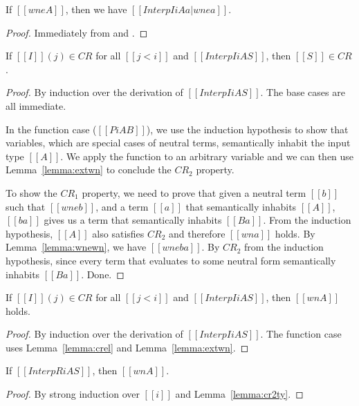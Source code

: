 \documentclass[acmsmall,screen=true,
\ifpublic review=false\else,review=true\fi
  ,anonymous=\ifanonymous true\else false\fi]{acmart}
\begin{document}
\begin{lemma}
  \label{lemma:cr1ty}
  If $[[wne A]]$, then we have $[[Interp I i A {a | wne a }]]$.
\end{lemma}
\begin{proof}
  Immediately from  and .
\end{proof}

\begin{lemma}
  \label{lemma:crel}
  If $[[I]](j) \in CR$ for all $[[j < i]]$ and $[[Interp I i A S]]$, then $[[S]] \in CR$.
\end{lemma}
\begin{proof}
  By induction over the derivation of $[[Interp I i A S]]$. The base
  cases are all immediate.

  In the function case ($[[Pi A B]]$), we use the induction
  hypothesis to show that variables, which are special cases of
  neutral terms, semantically inhabit the input type $[[A]]$. We apply the
  function to an arbitrary variable and we can then use
  Lemma~\ref{lemma:extwn} to conclude the $CR_2$ property.

  To show
  the $CR_1$ property, we need to prove that given a neutral term $[[b]]$
  such that $[[wne b]]$,
  and a term $[[a]]$ that semantically inhabits $[[A]]$, $[[b a]]$ gives
  us a term that semantically inhabits $[[B {a}]]$. From the induction
  hypothesis, $[[A]]$ also satisfies $CR_2$ and therefore $[[wn a]]$
  holds. By Lemma~\ref{lemma:wnewn}, we have $[[wne b a]]$. By $CR_2$
  from the induction hypothesis, since every term that evaluates to
  some neutral form semantically inhabits $[[B {a}]]$. Done.
\end{proof}


\begin{lemma}
  \label{lemma:cr2ty}
  If $[[I]](j) \in CR$ for all $[[j < i]]$ and $[[Interp I i A S]]$, then $[[wn A]]$ holds.
\end{lemma}
\begin{proof}
  By induction over the derivation of $[[Interp I i A S]]$. The
  function case uses Lemma~\ref{lemma:crel} and Lemma~\ref{lemma:extwn}.
\end{proof}

\begin{lemma}
  \label{lemma:cr2tyrec}
  If $[[InterpR i A S]]$, then $[[wn A]]$.
\end{lemma}
\begin{proof}
  By strong induction over $[[i]]$ and Lemma~\ref{lemma:cr2ty}.
\end{proof}
\end{document}
